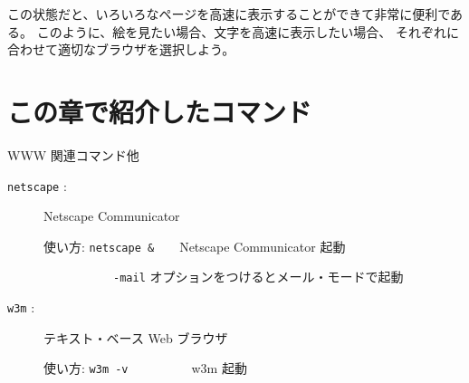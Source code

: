 この状態だと、いろいろなページを高速に表示することができて非常に便利である。
このように、絵を見たい場合、文字を高速に表示したい場合、
それぞれに合わせて適切なブラウザを選択しよう。

\section*{この章で紹介したコマンド}

\begin{center}
\begin{minipage}{13cm}
\begin{itembox}[l]{WWW 関連コマンド他}
\begin{description}
\item[\texttt{netscape} :] Netscape Communicator

使い方: \texttt{netscape \&}~~~~Netscape Communicator 起動

~~~~~~~~~~~\texttt{-mail} オプションをつけるとメール・モードで起動
\item[\texttt{w3m} :] テキスト・ベース Web ブラウザ

使い方: \texttt{w3m -v}~~~~~~~~~~w3m 起動
\end{description}
\end{itembox}
\end{minipage}
\end{center}

